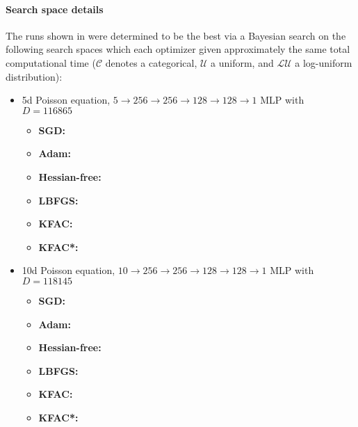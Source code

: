 \paragraph{Search space details} The runs shown in  were determined to be the best via a Bayesian search on the following search spaces which each optimizer given approximately the same total computational time ($\mathcal{C}$ denotes a categorical, $\mathcal{U}$ a uniform, and $\mathcal{LU}$ a log-uniform distribution):
\begin{itemize}

\item 5d Poisson equation, $5 \to 256 \to 256 \to 128 \to 128 \to 1$ MLP with $D=\num{116865}$
  \begin{itemize}
    \def\pathToRuns{kfac_pinns_exp/exp26_poisson5d_mlp_tanh_256_bayes/tex}
  \item \textbf{SGD:} 
  \item \textbf{Adam:} 
  \item \textbf{Hessian-free:} 
  \item \textbf{LBFGS:} 
  \item \textbf{KFAC:} 
  \item \textbf{KFAC*:} 
  \end{itemize}

\item 10d Poisson equation, $10 \to 256 \to 256 \to 128 \to 128 \to 1$ MLP with $D=\num{118145}$
  \begin{itemize}
    \def\pathToRuns{kfac_pinns_exp/exp32_poisson10d_mlp_tanh_256_bayes/tex}
  \item \textbf{SGD:} 
  \item \textbf{Adam:} 
  \item \textbf{Hessian-free:} 
  \item \textbf{LBFGS:} 
  \item \textbf{KFAC:} 
  \item \textbf{KFAC*:} 
  \end{itemize}


\end{itemize}
